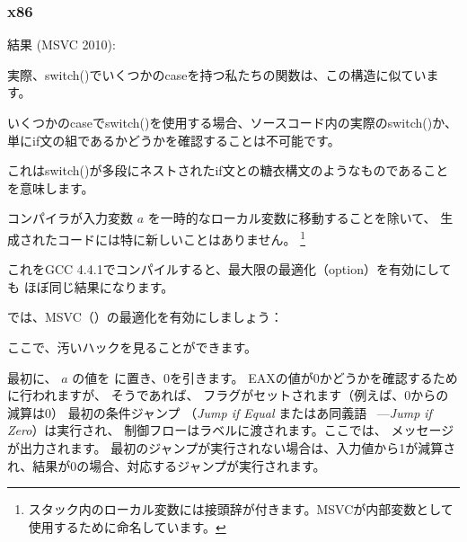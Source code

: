﻿\subsubsection{x86}


結果 (MSVC 2010):



実際、switch()でいくつかのcaseを持つ私たちの関数は、この構造に似ています。




いくつかのcaseでswitch()を使用する場合、ソースコード内の実際のswitch()か、
単にif文の組であるかどうかを確認することは不可能です。
\myindex{\SyntacticSugar}

これはswitch()が多段にネストされたif文との糖衣構文のようなものであることを意味します。

コンパイラが入力変数 $a$ を一時的なローカル変数に移動することを除いて、
生成されたコードには特に新しいことはありません。
\footnote{スタック内のローカル変数には接頭辞が付きます。MSVCが内部変数として使用するために命名しています。}

これをGCC 4.4.1でコンパイルすると、最大限の最適化（\Othree option）を有効にしても
ほぼ同じ結果になります。


では、MSVC（\Ox）の最適化を有効にしましょう：

\label{JMP_instead_of_RET}


ここで、汚いハックを見ることができます。


最初に、 $a$ の値を \EAX に置き、0を引きます。 EAXの値が0かどうかを確認するために行われますが、
そうであれば、 \ZF フラグがセットされます（例えば、0からの減算は0）
最初の条件ジャンプ \JE （\emph{Jump if Equal} またはあ同義語 \JZ~---\emph{Jump if Zero}）は実行され、
制御フローはラベルに渡されます。ここでは、 メッセージが出力されます。
最初のジャンプが実行されない場合は、入力値から1が減算され、結果が0の場合、対応するジャンプが実行されます。

